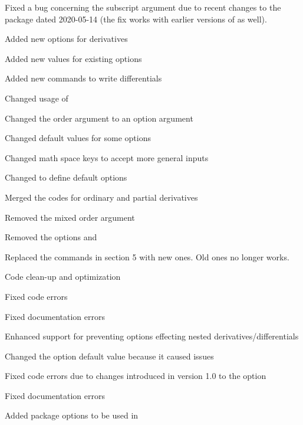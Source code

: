 \begin{changelog}
\begin{change}[version = 0.98, date = 2020-07-20, beta = true]
		\item Fixed a bug concerning the subscript argument due to recent changes to the  package dated 2020-05-14 (the fix works with earlier versions of  as well).
	\end{change}
	\begin{change}[version = 1.0, date = 2021-05-25, beta = false]
		\item Added new options for derivatives
		\item Added new values for existing options
		\item Added new commands to write differentials
		\item Changed usage of 
		\item Changed the order argument to an option argument
		\item Changed default values for some options
		\item Changed math space keys to accept more general inputs
		\item Changed  to define default options
		\item Merged the codes for ordinary and partial derivatives
		\item Removed the mixed order argument
		\item Removed the options  and 
		\item Replaced the commands in section 5 with new ones. Old ones no longer works.
		\item Code clean-up and optimization
		\item Fixed code errors
		\item Fixed documentation errors
		\item Enhanced support for preventing options effecting nested derivatives/differentials
	\end{change}
	\begin{change}[version = 1.01, date = 2021-05-28, beta = false]
		\item Changed the option  default value because it caused issues
		\item Fixed code errors due to changes introduced in version 1.0 to the option 
		\item Fixed documentation errors
	\end{change}
	\begin{change}[version = 1.1, date = 2021-06-03, beta = false]
		\item Added package options to be used in 

\end{change}
\end{changelog}
